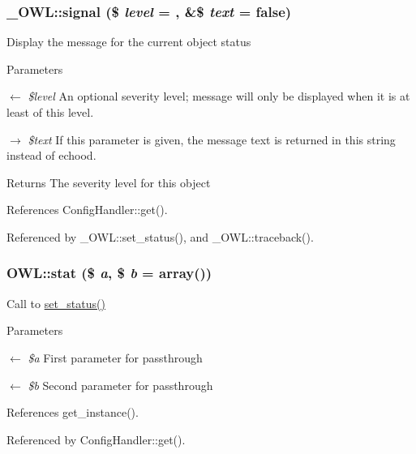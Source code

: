 \subsubsection[{signal}]{\setlength{\rightskip}{0pt plus 5cm}\_\-OWL::signal (\$ {\em level} = {}, \/  \&\$ {\em text} = {\ttfamily false})}\label{class__OWL_a51ba4a16409acf2a2f61f286939091a5}
Display the message for the current object status


\begin{DoxyParams}{Parameters}
\item[\mbox{$\leftarrow$} {\em \$level}]An optional severity level; message will only be displayed when it is at least of this level. \item[\mbox{$\rightarrow$} {\em \$text}]If this parameter is given, the message text is returned in this string instead of echood. \end{DoxyParams}
\begin{DoxyReturn}{Returns}
The severity level for this object 
\end{DoxyReturn}


References ConfigHandler::get().



Referenced by \_\-OWL::set\_\-status(), and \_\-OWL::traceback().

\subsubsection[{stat}]{\setlength{\rightskip}{0pt plus 5cm}OWL::stat (\$ {\em a}, \/  \$ {\em b} = {\ttfamily array()})}\label{classOWL_a6537b942a6cab370c296ff5befd8f382}
Call to \hyperlink{class__OWL_aea912d0ede9b3c2a69b79072d94d4787}{set\_\-status()} 
\begin{DoxyParams}{Parameters}
\item[\mbox{$\leftarrow$} {\em \$a}]First parameter for passthrough \item[\mbox{$\leftarrow$} {\em \$b}]Second parameter for passthrough \end{DoxyParams}


References get\_\-instance().



Referenced by ConfigHandler::get().

